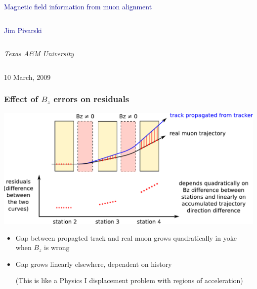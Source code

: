 \documentclass[compress]{beamer}
\begin{document}
\begin{frame}
\vfill
\begin{center}
\textcolor{darkblue}{\Large Magnetic field information from muon alignment}

\vfill
\begin{columns}
\begin{center}
\large
\textcolor{darkblue}{Jim Pivarski}
\end{center}
\end{columns}

\begin{columns}
\begin{center}
\scriptsize
{\it Texas A\&M University}
\end{center}
\end{columns}

\vfill
10 March, 2009

\end{center}
\end{frame}


\small

\begin{frame}
\frametitle{Effect of $B_z$ errors on residuals}

\vfill
\includegraphics[width=\linewidth]{paths.pdf}

\vfill
\begin{itemize}
\item Gap between propagted track and real muon grows quadratically in yoke when $B_z$ is wrong
\item Gap grows linearly elsewhere, dependent on history

{\scriptsize (This is like a Physics I displacement problem with regions of acceleration)}
\end{itemize}
\end{frame}
\end{document}
